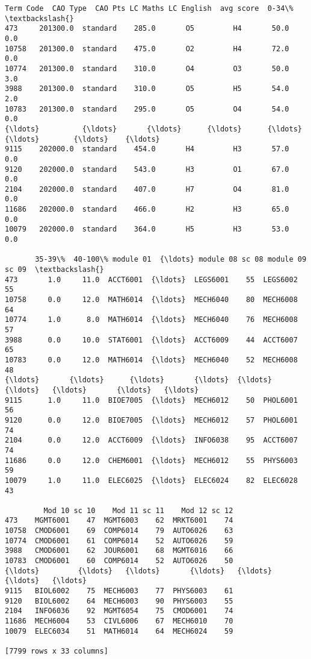 \documentclass[11pt]{article}
\makeatletter
\newcommand{\boxspacing}{\kern\kvtcb@left@rule\kern\kvtcb@boxsep}
\newcommand{\prompt}[4]{
        \ttfamily\llap{{\color{#2}[#3]:\hspace{3pt}#4}}\vspace{-\baselineskip}
    }
\makeatother
\begin{document}
            \begin{tcolorbox}[breakable, size=fbox, boxrule=.5pt, pad at break*=1mm, opacityfill=0]
\prompt{Out}{outcolor}{2}{\boxspacing}
\begin{Verbatim}[commandchars=\\\{\}]
       Term Code  CAO Type  CAO Pts LC Maths LC English  avg score  0-34\%  \textbackslash{}
473     201300.0  standard    285.0       O5         H4       50.0    0.0
10758   201300.0  standard    475.0       O2         H4       72.0    0.0
10774   201300.0  standard    310.0       O4         O3       50.0    3.0
3988    201300.0  standard    310.0       O5         H5       54.0    2.0
10783   201300.0  standard    295.0       O5         O4       54.0    0.0
{\ldots}          {\ldots}       {\ldots}      {\ldots}      {\ldots}        {\ldots}        {\ldots}    {\ldots}
9115    202000.0  standard    454.0       H4         H3       57.0    0.0
9120    202000.0  standard    543.0       H3         O1       67.0    0.0
2104    202000.0  standard    407.0       H7         O4       81.0    0.0
11686   202000.0  standard    466.0       H2         H3       65.0    0.0
10079   202000.0  standard    364.0       H5         H3       53.0    0.0

       35-39\%  40-100\% module 01  {\ldots} module 08 sc 08 module 09 sc 09  \textbackslash{}
473       1.0     11.0  ACCT6001  {\ldots}  LEGS6001    55  LEGS6002    55
10758     0.0     12.0  MATH6014  {\ldots}  MECH6040    80  MECH6008    64
10774     1.0      8.0  MATH6014  {\ldots}  MECH6040    76  MECH6008    57
3988      0.0     10.0  STAT6001  {\ldots}  ACCT6009    44  ACCT6007    65
10783     0.0     12.0  MATH6014  {\ldots}  MECH6040    52  MECH6008    48
{\ldots}       {\ldots}      {\ldots}       {\ldots}  {\ldots}       {\ldots}   {\ldots}       {\ldots}   {\ldots}
9115      1.0     11.0  BIOE7005  {\ldots}  MECH6012    50  PHOL6001    56
9120      0.0     12.0  BIOE7005  {\ldots}  MECH6012    57  PHOL6001    74
2104      0.0     12.0  ACCT6009  {\ldots}  INFO6038    95  ACCT6007    74
11686     0.0     12.0  CHEM6001  {\ldots}  MECH6012    55  PHYS6003    59
10079     1.0     11.0  ELEC6025  {\ldots}  ELEC6024    82  ELEC6028    43

         Mod 10 sc 10    Mod 11 sc 11    Mod 12 sc 12
473    MGMT6001    47  MGMT6003    62  MRKT6001    74
10758  CMOD6001    69  COMP6014    79  AUTO6026    63
10774  CMOD6001    61  COMP6014    52  AUTO6026    59
3988   CMOD6001    62  JOUR6001    68  MGMT6016    66
10783  CMOD6001    60  COMP6014    52  AUTO6026    50
{\ldots}         {\ldots}   {\ldots}       {\ldots}   {\ldots}       {\ldots}   {\ldots}
9115   BIOL6002    75  MECH6003    77  PHYS6003    61
9120   BIOL6002    64  MECH6003    90  PHYS6003    55
2104   INFO6036    92  MGMT6054    75  CMOD6001    74
11686  MECH6004    53  CIVL6006    67  MECH6010    70
10079  ELEC6034    51  MATH6014    64  MECH6024    59

[7799 rows x 33 columns]
\end{Verbatim}
\end{tcolorbox}
        
\end{document}
